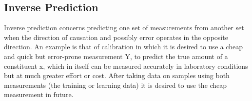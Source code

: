 \documentclass[MASTER.tex]{subfiles}
\begin{document}
\subsection{Inverse Prediction}
Inverse prediction concerns predicting one set of measurements from another set when the direction of causation and possibly error operates in the opposite direction. An example is that of calibration in which it is desired to use a cheap and quick but error-prone measurement Y, to predict the true amount of a constituent x, which in itself can be measured accurately in laboratory conditions but at much greater effort or cost. After taking data on samples using both measurements (the training or learning data) it is desired to use the cheap measurement in future.
\end{document}
